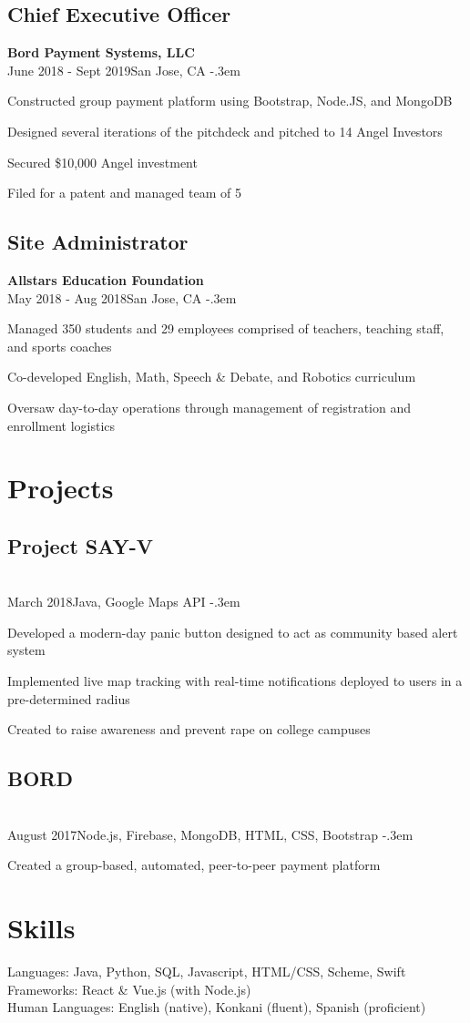 \documentclass{article}
\let\olditemize=\itemize \let\endolditemize=\enditemize
\renewenvironment{itemize}{\olditemize[topsep=0em] \itemsep-.3em}{\endolditemize}
\newcommand{\entry}[3]{\quad\textbf{#1}\\#2\qquad#3}
\begin{document}
	\subsection{Chief Executive Officer}
	\entry{Bord Payment Systems, LLC}{June 2018 - Sept 2019}{San Jose, CA}
	\begin{itemize}
		\item Constructed group payment platform using Bootstrap, Node.JS, and MongoDB
		\item Designed several iterations of the pitchdeck and pitched to 14 Angel Investors
		\item Secured \$10,000 Angel investment
		\item Filed for a patent and managed team of 5
	\end{itemize}
	\subsection{Site Administrator}
	\entry{Allstars Education Foundation}{May 2018 - Aug 2018}{San Jose, CA}
	\begin{itemize}
		\item Managed 350 students and 29 employees comprised of teachers, teaching staff, and sports coaches
		\item Co-developed English, Math, Speech \& Debate, and Robotics curriculum
		\item Oversaw day-to-day operations through management of registration and enrollment logistics
	\end{itemize}
	
	\section{Projects}
	\subsection{Project SAY-V}
	\entry{}{March 2018}{Java, Google Maps API}
	\begin{itemize}
		\item Developed a modern-day panic button designed to act as community based alert system
		\item Implemented live map tracking with real-time notifications deployed to users in a pre-determined radius
		\item Created to raise awareness and prevent rape on college campuses
	\end{itemize}
	
	\subsection{BORD}
	\entry{}{August 2017}{Node.js, Firebase, MongoDB, HTML, CSS, Bootstrap}
	\begin{itemize}
		\item Created a group-based, automated, peer-to-peer payment platform
	\end{itemize}
	
	
	
	\section{Skills}
	Languages:
	Java, Python, SQL, Javascript, HTML/CSS, Scheme, Swift \\
	Frameworks:
	React \& Vue.js (with Node.js) \\
	Human Languages:
	English (native), Konkani (fluent), Spanish (proficient)
	
	
\end{document}
